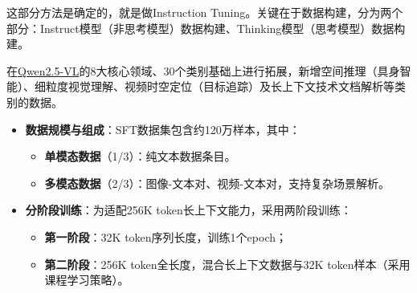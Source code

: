 \documentclass[zihao=false,fontset=windows]{ctexart}
\begin{document}
这部分方法是确定的，就是做Instruction Tuning。关键在于数据构建，分为两个部分：Instruct模型（非思考模型）数据构建、Thinking模型（思考模型）数据构建。\par

\Needspace{2cm}\par\vspace{0.9em}\par\vspace{0.28em}

在\href{https://scnajei2ds6y.feishu.cn/wiki/S7Q2wviQhiYtQFk4jKvccQwDnWe}{Qwen2.5-VL}的8大核心领域、30个类别基础上进行拓展，新增空间推理（具身智能）、细粒度视觉理解、视频时空定位（目标追踪）及长上下文技术文档解析等类别的数据。\par

\begin{itemize}[label=\textcolor{feishuBlue}{\textbullet}]
\item \textbf{数据规模与组成}：SFT数据集包含约120万样本，其中：
\begin{itemize}[label=\textcolor{feishuBlue}{\textbullet}]
\item \textbf{单模态数据}（1/3）：纯文本数据条目。

\end{itemize}

\begin{itemize}[label=\textcolor{feishuBlue}{\textbullet}]
\item \textbf{多模态数据}（2/3）：图像-文本对、视频-文本对，支持复杂场景解析。

\end{itemize}

\end{itemize}

\begin{itemize}[label=\textcolor{feishuBlue}{\textbullet}]
\item \textbf{分阶段训练}：为适配256K token长上下文能力，采用两阶段训练：
\begin{itemize}[label=\textcolor{feishuBlue}{\textbullet}]
\item \textbf{第一阶段}：32K token序列长度，训练1个epoch；

\end{itemize}

\begin{itemize}[label=\textcolor{feishuBlue}{\textbullet}]
\item \textbf{第二阶段}：256K token全长度，混合长上下文数据与32K token样本（\textcolor{feishuRed}{采用课程学习策略}）。

\end{itemize}

\end{itemize}
\end{document}
